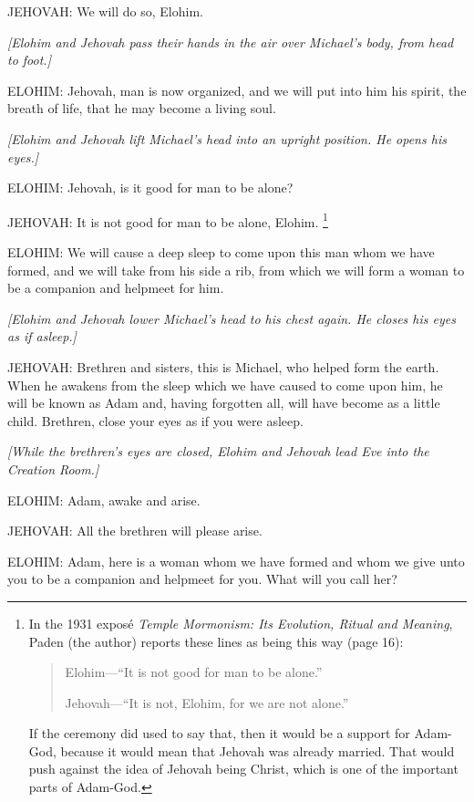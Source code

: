				JEHOVAH: We will do so, Elohim.

				\textit{[Elohim and Jehovah pass their hands in the air over Michael's body, from head to foot.]}

				ELOHIM: Jehovah, man is now organized, and we will put into him his spirit, the breath of life, that he may become a living soul.

				\textit{[Elohim and Jehovah lift Michael's head into an upright position. He opens his eyes.]}
				
				ELOHIM: Jehovah, is it good for man to be alone?

				JEHOVAH: It is not good for man to be alone, Elohim.%
					\footnote{%
						\label{ENDOWMENT-alone}%
						In the 1931 expos\'{e} \textit{Temple Mormonism: Its Evolution, Ritual and Meaning}, Paden (the author) reports these lines as being this way (page 16):
							\begin{quote}
								Elohim---``It is not good for man to be alone.''
								
								Jehovah---``It is not, Elohim, for we are not alone.''
							\end{quote}
						If the ceremony did used to say that, then it would be a support for Adam-God, because it would mean that Jehovah was already married. That would push against the idea of Jehovah being Christ, which is one of the important parts of Adam-God.
						}

				ELOHIM: We will cause a deep sleep to come upon this man whom we have formed, and we will take from his side a rib, from which we will form a woman to be a companion and helpmeet for him.

				\textit{[Elohim and Jehovah lower Michael's head to his chest again. He closes his eyes as if asleep.]}

				JEHOVAH: Brethren and sisters, this is Michael, who helped form the earth. When he awakens from the sleep which we have caused to come upon him, he will be known as Adam and, having forgotten all, will have become as a little child. Brethren, close your eyes as if you were asleep.

				\textit{[While the brethren's eyes are closed, Elohim and Jehovah lead Eve into the Creation Room.]}

				ELOHIM: Adam, awake and arise.

				JEHOVAH: All the brethren will please arise.

				ELOHIM: Adam, here is a woman whom we have formed and whom we give unto you to be a companion and helpmeet for you. What will you call her?

